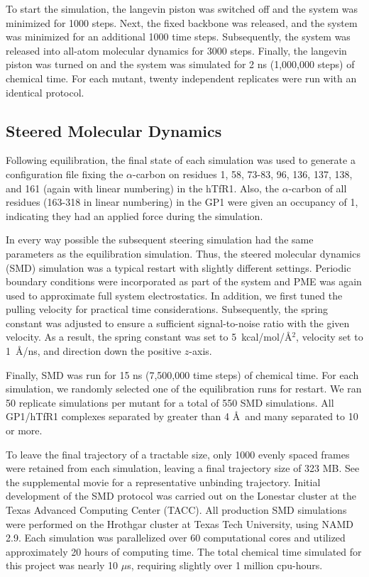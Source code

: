 \documentclass[12pt]{article}
\begin{document}
To start the simulation, the langevin piston was switched off and the system was minimized for 1000 steps. Next, the fixed backbone was released, and the system was minimized for an additional 1000 time steps. Subsequently, the system was released into all-atom molecular dynamics for 3000 steps. Finally, the langevin piston was turned on and the system was simulated for 2 ns (1,000,000 steps) of chemical time. For each mutant, twenty independent replicates were run with an identical protocol.

\subsection*{Steered Molecular Dynamics}

Following equilibration, the final state of each simulation was used to generate a configuration file fixing the $\alpha$-carbon on residues 1, 58, 73-83, 96, 136, 137, 138, and 161 (again with linear numbering) in the hTfR1. Also, the $\alpha$-carbon of all residues (163-318 in linear numbering) in the GP1 were given an occupancy of 1, indicating they had an applied force during the simulation. 

In every way possible the subsequent steering simulation had the same parameters as the equilibration simulation. Thus, the steered molecular dynamics (SMD) \citep{Is2001A,Is2001B} simulation was a typical restart with slightly different settings. Periodic boundary conditions were incorporated as part of the system and PME was again used to approximate full system electrostatics. In addition, we first tuned the pulling velocity for practical time considerations. Subsequently, the spring constant was adjusted to ensure a sufficient signal-to-noise ratio with the given velocity. As a result, the spring constant was set to 5~kcal/mol/\AA$^2$, velocity set to 1~\AA/ns, and direction down the positive $z$-axis.

Finally, SMD was run for 15 ns (7,500,000 time steps) of chemical time. For each simulation, we randomly selected one of the equilibration runs for restart. We ran 50 replicate simulations per mutant for a total of 550 SMD simulations. All GP1/hTfR1 complexes separated by greater than 4 \AA\ and many separated to 10 or more.

To leave the final trajectory of a tractable size, only 1000 evenly spaced frames were retained from each simulation, leaving a final trajectory size of 323 MB. See the supplemental movie for a representative unbinding trajectory. Initial development of the SMD protocol was carried out on the Lonestar cluster at the Texas Advanced Computing Center (TACC). All production SMD simulations were performed on the Hrothgar cluster at Texas Tech University, using NAMD 2.9. Each simulation was parallelized over 60 computational cores and utilized approximately 20 hours of computing time. The total chemical time simulated for this project was nearly 10 $\mu$s, requiring slightly over 1 million cpu-hours.
\end{document}
